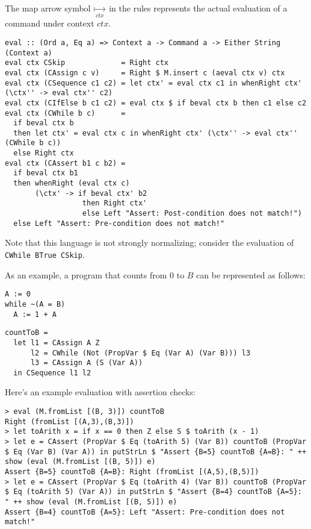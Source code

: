 \documentclass{article}
\begin{document}
The map arrow symbol $\underset{ctx}{\mapsto}$ in the rules represents the actual evaluation of a command under context $ctx$.

\begin{lstlisting}
eval :: (Ord a, Eq a) => Context a -> Command a -> Either String (Context a)
eval ctx CSkip             = Right ctx
eval ctx (CAssign c v)     = Right $ M.insert c (aeval ctx v) ctx
eval ctx (CSequence c1 c2) = let ctx' = eval ctx c1 in whenRight ctx' (\ctx'' -> eval ctx'' c2)
eval ctx (CIfElse b c1 c2) = eval ctx $ if beval ctx b then c1 else c2
eval ctx (CWhile b c)      =
  if beval ctx b
  then let ctx' = eval ctx c in whenRight ctx' (\ctx'' -> eval ctx'' (CWhile b c))
  else Right ctx
eval ctx (CAssert b1 c b2) =
  if beval ctx b1
  then whenRight (eval ctx c)
       (\ctx' -> if beval ctx' b2
                  then Right ctx'
                  else Left "Assert: Post-condition does not match!")
  else Left "Assert: Pre-condition does not match!"
\end{lstlisting}

Note that this language is not strongly normalizing; consider the evaluation of \texttt{CWhile BTrue CSkip}.

As an example, a program that counts from 0 to $B$ can be represented as follows:

\begin{minipage}{0.29\textwidth}
\begin{lstlisting}
A := 0
while ~(A = B)
  A := 1 + A
\end{lstlisting}
\end{minipage}
\begin{minipage}{0.69\textwidth}
\begin{lstlisting}
countToB =
  let l1 = CAssign A Z
      l2 = CWhile (Not (PropVar $ Eq (Var A) (Var B))) l3
      l3 = CAssign A (S (Var A))
  in CSequence l1 l2
\end{lstlisting}
\end{minipage}

Here's an example evaluation with assertion checks:

\begin{lstlisting}
> eval (M.fromList [(B, 3)]) countToB
Right (fromList [(A,3),(B,3)])
> let toArith x = if x == 0 then Z else S $ toArith (x - 1)
> let e = CAssert (PropVar $ Eq (toArith 5) (Var B)) countToB (PropVar $ Eq (Var B) (Var A)) in putStrLn $ "Assert {B=5} countToB {A=B}: " ++ show (eval (M.fromList [(B, 5)]) e)
Assert {B=5} countToB {A=B}: Right (fromList [(A,5),(B,5)])
> let e = CAssert (PropVar $ Eq (toArith 4) (Var B)) countToB (PropVar $ Eq (toArith 5) (Var A)) in putStrLn $ "Assert {B=4} countToB {A=5}: " ++ show (eval (M.fromList [(B, 5)]) e)
Assert {B=4} countToB {A=5}: Left "Assert: Pre-condition does not match!"
\end{lstlisting}
\end{document}
